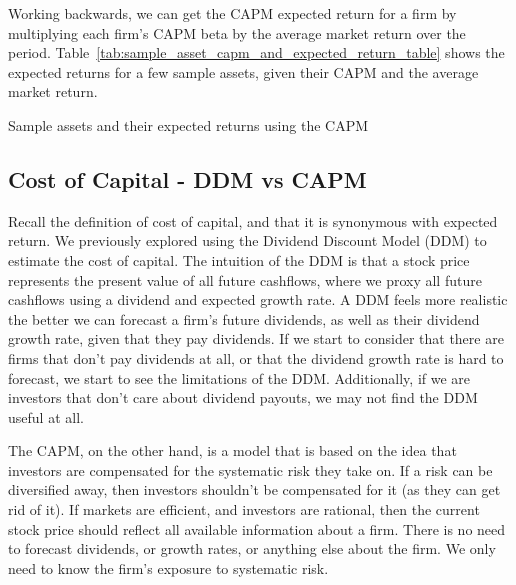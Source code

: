 Working backwards, we can get the CAPM expected return for a firm by multiplying each firm's CAPM beta by the average market return over the period.
Table~\ref{tab:sample_asset_capm_and_expected_return_table} shows the expected returns for a few sample assets, given their CAPM and the average market return.

\begin{table}
    \centering
    \vspace{1em}
    
    \caption{Sample assets and their expected returns using the CAPM}
    \label{tab:sample_asset_capm_and_expected_return_table}
    \vspace{1em}
    \centering
\end{table}

\subsection{Cost of Capital - DDM vs CAPM}

Recall the definition of cost of capital, and that it is synonymous with expected return.
We previously explored using the Dividend Discount Model (DDM) to estimate the cost of capital. The intuition of the 
DDM is that a stock price represents the present value of all future cashflows, where we proxy all future cashflows using a dividend and expected growth rate.
A DDM feels more realistic the better we can forecast a firm's future dividends, as well as their dividend growth rate, given that they pay dividends.
If we start to consider that there are firms that don't pay dividends at all, or that the dividend growth rate is hard to forecast, we start to see the limitations of the DDM.
Additionally, if we are investors that don't care about dividend payouts, we may not find the DDM useful at all.

The CAPM, on the other hand, is a model that is based on the idea that investors are compensated for the systematic risk they take on. If a risk can be diversified away, then
investors shouldn't be compensated for it (as they can get rid of it).
If markets are efficient, and investors are rational, then the current stock price should reflect all available information about a firm.
There is no need to forecast dividends, or growth rates, or anything else about the firm. We only need to know the firm's exposure to systematic risk.

